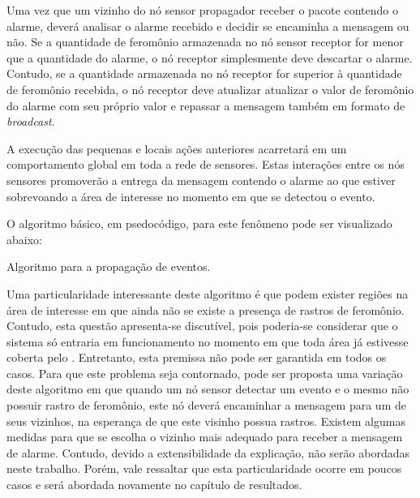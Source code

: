 Uma vez que um vizinho do nó sensor propagador receber o pacote contendo o alarme, deverá analisar o alarme recebido e decidir se encaminha a mensagem ou não.  Se a quantidade de feromônio armazenada no nó sensor receptor for menor que a quantidade do alarme, o nó receptor simplesmente deve descartar o alarme. Contudo, se a quantidade armazenada no nó receptor for superior à quantidade de feromônio recebida, o nó receptor deve atualizar atualizar o valor de feromônio do alarme com seu próprio valor e repassar a mensagem também em formato de \emph{broadcast}. 

A execução das pequenas e locais ações anteriores acarretará em um comportamento global em toda a rede de sensores. Estas interações entre os nós sensores promoverão a entrega da mensagem contendo o alarme ao \vant que estiver sobrevoando a área de interesse no momento em que se detectou o evento.

O algoritmo básico, em psedocódigo, para este fenômeno pode ser visualizado abaixo: \\


\begin{algorithm}[H]
	\SetAlgoLined
	


	
\caption{Algoritmo para a propagação de eventos.}
\end{algorithm}


Uma particularidade interessante deste algoritmo é que podem exister regiões na área de interesse em que ainda não se existe a presença de rastros de feromônio. Contudo, esta questão apresenta-se discutível, pois poderia-se considerar que o sistema só entraria em funcionamento no momento em que toda área já estivesse coberta pelo \vant. Entretanto, esta premissa não pode ser garantida em todos os casos. Para que este problema seja contornado, pode ser proposta uma variação deste algoritmo em que quando um nó sensor detectar um evento e o mesmo não possuir rastro de feromônio, este nó deverá encaminhar a mensagem para um de seus vizinhos, na esperança de que este visinho possua rastros. Existem algumas medidas para que se escolha o vizinho mais adequado para receber a mensagem de alarme. Contudo, devido a extensibilidade da explicação, não serão abordadas neste trabalho. Porém, vale ressaltar que esta particularidade ocorre em poucos casos e será abordada novamente no capítulo de resultados.

